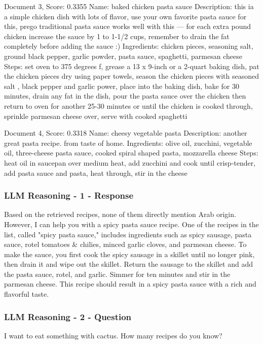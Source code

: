 \documentclass[a4paper,11pt]{article}
\begin{document}
Document 3, Score: 0.3355
Name: baked chicken pasta sauce
Description: this ia a simple chicken dish with lots of flavor, use your own favorite pasta sauce for this, prego traditional pasta sauce works well with this --- for each extra pound chicken increase the sauce by 1 to 1-1/2 cups, remember to drain the fat completely before adding the sauce :)
Ingredients: chicken pieces, seasoning salt, ground black pepper, garlic powder, pasta sauce, spaghetti, parmesan cheese
Steps: set oven to 375 degrees f, grease a 13 x 9-inch or a 2-quart baking dish, pat the chicken pieces dry using paper towels, season the chicken pieces with seasoned salt , black pepper and garlic power, place into the baking dish, bake for 30 minutes, drain any fat in the dish, pour the pasta sauce over the chicken then return to oven for another 25-30 minutes or until the chicken is cooked through, sprinkle parmesan cheese over, serve with cooked spaghetti

Document 4, Score: 0.3318
Name: cheesy vegetable pasta
Description: another great pasta recipe.  from taste of home.
Ingredients: olive oil, zucchini, vegetable oil, three-cheese pasta sauce, cooked spiral shaped pasta, mozzarella cheese
Steps: heat oil in saucepan over medium heat, add zucchini and cook until crisp-tender, add pasta sauce and pasta, heat through, stir in the cheese


\subsubsection{LLM Reasoning - 1 - Response}
Based on the retrieved recipes, none of them directly mention Arab origin. However, I can help you with a spicy pasta sauce recipe.
One of the recipes in the list, called "spicy pasta sauce," includes ingredients such as spicy sausage, pasta sauce, rotel tomatoes \& chilies,
minced garlic cloves, and parmesan cheese. To make the sauce, you first cook the spicy sausage in a skillet until no longer pink, 
then drain it and wipe out the skillet. Return the sausage to the skillet and add the pasta sauce, rotel, and garlic. 
Simmer for ten minutes and stir in the parmesan cheese. This recipe should result in a spicy pasta sauce with a rich and flavorful taste.


\subsubsection{LLM Reasoning - 2 - Question}
I want to eat something with cactus. How many recipes do you know?
\end{document}
